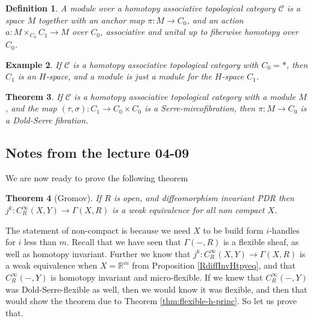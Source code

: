 \documentclass{article}
\newtheorem{theorem}{Theorem}[section]
\newtheorem{definition}[theorem]{Definition}
\newtheorem{example}[theorem]{Example}
\newtheorem{proposed work}[theorem]{Proposed Work}
\begin{document}
\begin{definition}
A module over a homotopy associative topological category $\mathcal{C}$ is a space $M$ together with an anchor map $\pi: M\to C_0$, and an action $a: M\times_{C_0} C_1 \to M$ over $C_0$, associative and unital up to fiberwise homotopy over $C_0$.
\end{definition}

\begin{example}
If $\mathcal{C}$ is a homotopy associative topological category with $C_0=*$, then $C_1$ is an $H$-space, and a module is just a module for the $H$-space $C_1$. 
\end{example}

\begin{theorem}\label{Fib&HATCat}
If $\mathcal{C}$ is a homotopy associative topological category with a module $M$, and the map $(\tau, \sigma): C_1\to C_0 \times C_0$ is a Serre-mircofibration, then $\pi :M\to C_0$ is a Dold-Serre fibration.
\end{theorem}

\subsection{Notes from the lecture 04-09}
We are now ready to prove the following theorem
\begin{theorem}[Gromov]\label{thm:Gromov} If $R$ is open, and diffeomorphism invariant PDR then $j^k: C_R^\infty(X,Y)\to \Gamma(X, R)$ is a weak equivalence for all non compact $X$.
\end{theorem}
The statement of non-compact is because we need $X$ to be build form $i$-handles for $i$ less than $m$. Recall that we have seen that $\Gamma(-,R)$ is a flexible sheaf, as well as homotopy invariant. Further we know that $j^k: C_R^\infty(X,Y)\to \Gamma(X, R)$ is a weak equivalence when $X=\mathbb{R}^m$ from Proposition \ref{RdiffInvHtpyeq}, and that $C^\infty_R(-,Y)$ is homotopy invariant and micro-flexible. If we knew that $C^\infty_R(-,Y)$ was Dold-Serre-flexible as well, then we would know it was flexible, and then that would show the theorem due to Theorem \ref{thm:flexible-h-princ}. So let us prove that.
\end{document}
